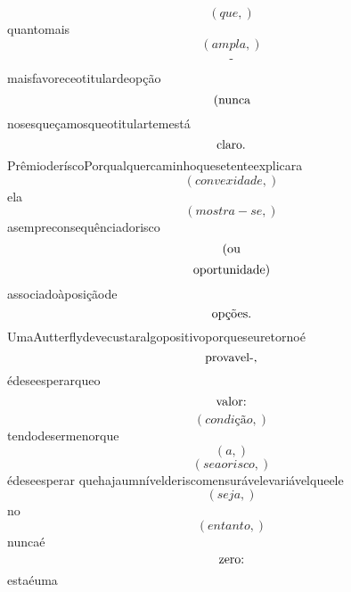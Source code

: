 \documentclass{article}
\begin{document}
\begin{equation}
\left( que,\right)
\end{equation}quantomais\begin{equation}
\left( ampla,\right)
\end{equation}\begin{equation}
$-$
\end{equation}maisfavoreceotitulardeopção\begin{equation}
$(nunca$
\end{equation}nosesqueçamosqueotitulartemestá\begin{equation}
$claro.$
\end{equation}PrêmioderíscoPorqualquercaminhoquesetenteexplicara\begin{equation}
\left( convexidade,\right)
\end{equation}ela\begin{equation}
\left( mostra - se,\right)
\end{equation}asempreconsequênciadorisco\begin{equation}
$(ou$
\end{equation}\begin{equation}
$oportunidade)$
\end{equation}associadoàposiçãode\begin{equation}
$opções.$
\end{equation}UmaAutterflydevecustaralgopositivoporqueseuretornoé\begin{equation}
$provavel-,$
\end{equation}édeseesperarqueo\begin{equation}
$valor:$
\end{equation}\begin{equation}
\left( condição,\right)
\end{equation}tendodesermenorque\begin{equation}
\left( a,\right)
\end{equation}\begin{equation}
\left( seaorisco,\right)
\end{equation}édeseesperar quehajaumnívelderiscomensurávelevariávelqueele\begin{equation}
\left( seja,\right)
\end{equation}no\begin{equation}
\left( entanto,\right)
\end{equation}nuncaé\begin{equation}
$zero:$
\end{equation}estaéuma\begin{equation}

\end{equation}
\end{document}
